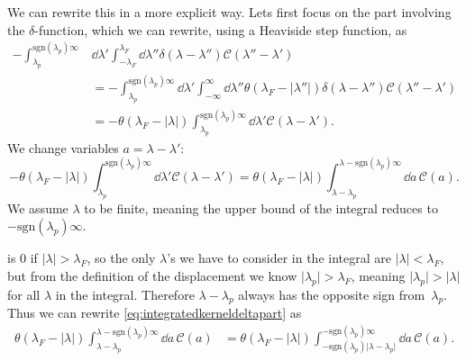 \documentclass[11pt, a4paper,draft]{report} %
\newcommand{\kernel}{\mathcal{C}}
\begin{document}
\begin{sloppypar}
We can rewrite this in a more explicit way.
Lets first focus on the part involving the \(\delta\)-function, which we can rewrite, using a Heaviside step function, as
\begin{align}
	- \int_{\lambda_p}^{\textrm{sgn}(\lambda_p)\infty} &\dd \lambda' \int_{-\lambda_F}^{\lambda_F} \dd  \lambda'' \delta(\lambda-\lambda'') \kernel(\lambda''-\lambda') \\
	&=- \int_{\lambda_p}^{\textrm{sgn}(\lambda_p)\infty} \dd \lambda' \int_{-\infty}^{\infty} \dd \lambda'' \theta(\lambda_F - \lvert \lambda'' \rvert)  \delta(\lambda-\lambda'') \kernel(\lambda''-\lambda')\\
	&= - \theta(\lambda_F - \lvert \lambda \rvert) \int_{\lambda_p}^{\textrm{sgn}(\lambda_p)\infty} \dd \lambda'     \kernel(\lambda-\lambda').
\end{align}
We change variables \(a=\lambda-\lambda'\):
\begin{equation}\label{eq:integratedkerneldeltapart}
	- \theta(\lambda_F - \lvert \lambda \rvert) \int_{\lambda_p}^{\textrm{sgn}(\lambda_p)\infty} \dd \lambda'     \kernel(\lambda-\lambda')=
	 \theta(\lambda_F - \lvert \lambda \rvert) \int_{\lambda-\lambda_p}^{\lambda - \textrm{sgn}(\lambda_p)\infty} \dd a\,\kernel(a).
\end{equation}
We assume \(\lambda\) to be finite, meaning the upper bound of the integral reduces to \(-\textrm{sgn}(\lambda_p)\infty\).
\end{sloppypar}

 is 0 if \(\lvert \lambda\rvert > \lambda_F\), so the only \(\lambda\)'s we have to consider in the integral are \(\lvert\lambda\rvert< \lambda_F\), but from the definition of the displacement we know \(\lvert\lambda_p\rvert >\lambda_F\), meaning \(\lvert\lambda_p\rvert > \lvert\lambda\rvert\) for all \(\lambda\) in the integral.
Therefore \(\lambda-\lambda_p\) always has the opposite sign from~\(\lambda_p\).
Thus we can rewrite \cref{eq:integratedkerneldeltapart} as
\begin{align}
	\theta(\lambda_F - \lvert \lambda \rvert) \int_{\lambda-\lambda_p}^{\lambda - \textrm{sgn}(\lambda_p)\infty} \dd a\,\kernel(a) &=
	\theta(\lambda_F - \lvert \lambda \rvert) \int_{-\textrm{sgn}(\lambda_p)\lvert\lambda-\lambda_p\rvert}^{ - \textrm{sgn}(\lambda_p)\infty} \dd a\,\kernel(a).
\end{align}
\end{document}

